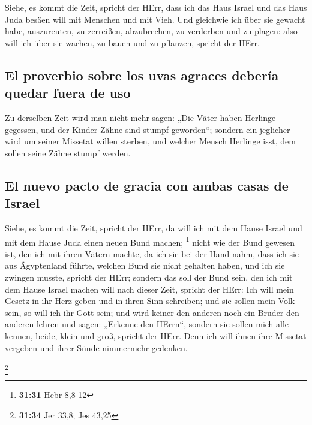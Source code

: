  Siehe, es kommt die Zeit, spricht der HErr, dass ich das
Haus Israel und das Haus Juda besäen will mit Menschen und mit Vieh.
 Und gleichwie ich über sie gewacht habe, auszureuten, zu
zerreißen, abzubrechen, zu verderben und zu plagen: also will ich über
sie wachen, zu bauen und zu pflanzen, spricht der HErr.

\hypertarget{el-proverbio-sobre-los-uvas-agraces-deberuxeda-quedar-fuera-de-uso}{%
\subsection{El proverbio sobre los uvas agraces debería quedar fuera de
uso}\label{el-proverbio-sobre-los-uvas-agraces-deberuxeda-quedar-fuera-de-uso}}

 Zu derselben Zeit wird man nicht mehr sagen: „Die Väter
haben Herlinge gegessen, und der Kinder Zähne sind stumpf geworden``;
 sondern ein jeglicher wird um seiner Missetat willen
sterben, und welcher Mensch Herlinge isst, dem sollen seine Zähne stumpf
werden.

\hypertarget{el-nuevo-pacto-de-gracia-con-ambas-casas-de-israel}{%
\subsection{El nuevo pacto de gracia con ambas casas de
Israel}\label{el-nuevo-pacto-de-gracia-con-ambas-casas-de-israel}}

 Siehe, es kommt die Zeit, spricht der HErr, da will ich
mit dem Hause Israel und mit dem Hause Juda einen neuen Bund machen;
\footnote{\textbf{31:31} Hebr 8,8-12}  nicht wie der Bund
gewesen ist, den ich mit ihren Vätern machte, da ich sie bei der Hand
nahm, dass ich sie aus Ägyptenland führte, welchen Bund sie nicht
gehalten haben, und ich sie zwingen musste, spricht der HErr;
 sondern das soll der Bund sein, den ich mit dem Hause
Israel machen will nach dieser Zeit, spricht der HErr: Ich will mein
Gesetz in ihr Herz geben und in ihren Sinn schreiben; und sie sollen
mein Volk sein, so will ich ihr Gott sein;  und wird
keiner den anderen noch ein Bruder den anderen lehren und sagen:
„Erkenne den HErrn``, sondern sie sollen mich alle kennen, beide, klein
und groß, spricht der HErr. Denn ich will ihnen ihre Missetat vergeben
und ihrer Sünde nimmermehr gedenken.

\footnote{\textbf{31:34} Jer 33,8; Jes 43,25}

